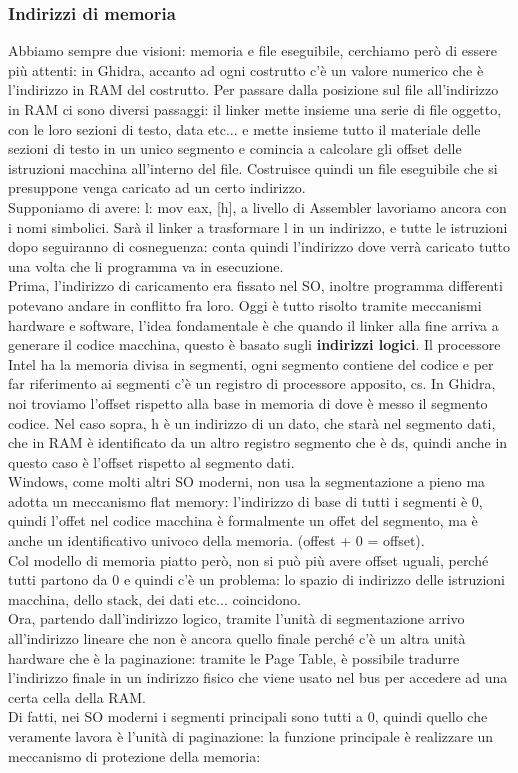 \documentclass{article}
\begin{document}
\subsubsection{Indirizzi di memoria}
Abbiamo sempre due visioni: memoria e file eseguibile, cerchiamo però di essere più attenti: in Ghidra, accanto ad ogni costrutto c'è un valore numerico che è l'indirizzo in RAM del costrutto. Per passare dalla posizione sul file all'indirizzo in RAM ci sono diversi passaggi: il linker mette insieme una serie di file oggetto, con le loro sezioni di testo, data etc... e mette insieme tutto il materiale delle sezioni di testo in un unico segmento e comincia a calcolare gli offset delle istruzioni macchina all'interno del file. Costruisce quindi un file eseguibile che si presuppone venga caricato ad un certo indirizzo.\\ Supponiamo di avere: \textsf{l: mov eax, [h]}, a livello di Assembler lavoriamo ancora con i nomi simbolici. Sarà il linker a trasformare l in un indirizzo, e tutte le istruzioni dopo seguiranno di cosneguenza: conta quindi l'indirizzo dove verrà caricato tutto una volta che li programma va in esecuzione.\\ Prima, l'indirizzo di caricamento era fissato nel SO, inoltre programma differenti potevano andare in conflitto fra loro. Oggi è tutto risolto tramite meccanismi hardware e software, l'idea fondamentale è che quando il linker alla fine arriva a generare il codice macchina, questo è basato sugli \textbf{indirizzi logici}. Il processore Intel ha la memoria divisa in segmenti, ogni segmento contiene del codice e per far riferimento ai segmenti c'è un registro di processore apposito, \textsf{cs}. In Ghidra, noi troviamo l'offset rispetto alla base in memoria di dove è messo il segmento codice. Nel caso sopra, h è un indirizzo di un dato, che starà nel segmento dati, che in RAM è identificato da un altro registro segmento che è \textsf{ds}, quindi anche in questo caso è l'offset rispetto al segmento dati.\\ Windows, come molti altri SO moderni, non usa la segmentazione a pieno ma adotta un meccanismo flat memory: l'indirizzo di base di tutti i segmenti è 0, quindi l'offet nel codice macchina è formalmente un offet del segmento, ma è anche un identificativo univoco della memoria. (offest + 0 = offset).\\ Col modello di memoria piatto però, non si può più avere offset uguali, perché tutti partono da 0 e quindi c'è un problema: lo spazio di indirizzo delle istruzioni macchina, dello stack, dei dati etc... coincidono.\\ Ora, partendo dall'indirizzo logico, tramite l'unità di segmentazione arrivo all'indirizzo lineare che non è ancora quello finale perché c'è un altra unità hardware che è la paginazione: tramite le Page Table, è possibile tradurre l'indirizzo finale in un indirizzo fisico che viene usato nel bus per accedere ad una certa cella della RAM.\\ Di fatti, nei SO moderni i segmenti principali sono tutti a 0, quindi quello che veramente lavora è l'unità di paginazione: la funzione principale è realizzare un meccanismo di protezione della memoria:
\end{document}
